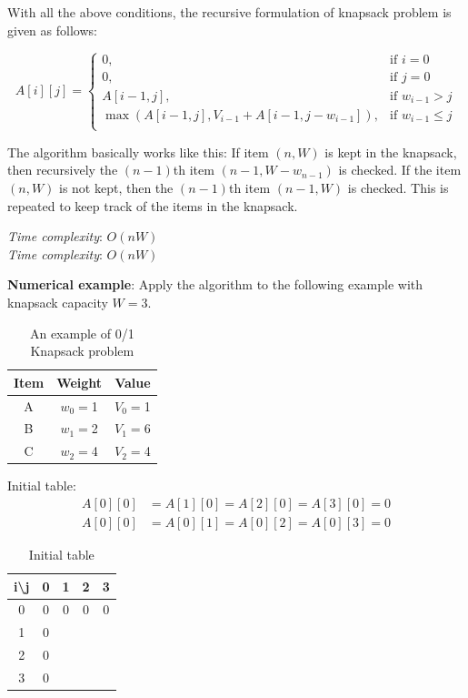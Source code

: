 \documentclass[a4paper,11pt]{book}
\begin{document}
\noindent With all the above conditions, the recursive formulation of knapsack problem is given as follows:

\[
    A[i][j]= 
\begin{cases}
    0, & \text{if } i=0\\
    0, & \text{if } j=0\\
    A[i-1,j], & \text{if } w_{i-1} > j\\
    \max(A[i-1,j], V_{i-1} + A[i-1,j-w_{i-1}]), & \text{if } w_{i-1} \leq j\\
\end{cases}
\]

\noindent The algorithm basically works like this: If item $(n,W)$ is kept in the knapsack, then recursively the $(n-1)$th item $(n-1, W-w_{n-1})$ is checked. If the item $(n,W)$ is not kept, then the $(n-1)$th item $(n-1, W)$ is checked. This is repeated to keep track of the items in the knapsack.

\vspace{5mm}

\noindent \textit{Time complexity}: $O(nW)$\\
\noindent \textit{Time complexity}: $O(nW)$

\vspace{3mm}

\noindent \textbf{Numerical example}: Apply the algorithm to the following example with knapsack capacity $W=3$.
\begin{table}[ht]
\centering
\begin{tabular}{|c|c|c|}
\hline
Item & Weight & Value \\ \hline
A    & $w_0=$1      & $V_0=$1     \\
B    & $w_1=$2      & $V_1=$6     \\
C    & $w_2=$4      & $V_2=$4 \\
\hline
\end{tabular}
\caption{An example of 0/1 Knapsack problem}
\end{table}

\noindent Initial table:
\begin{align*}
    A[0][0] &= A[1][0] = A[2][0] = A[3][0] = 0\\
    A[0][0] &= A[0][1] = A[0][2] = A[0][3] = 0
\end{align*}

\begin{table}[ht]
\centering
\begin{tabular}{|c|c|c|c|c|}
\hline
i\textbackslash{}j & 0 & 1 & 2 & 3 \\ \hline
0                  & 0 & 0 & 0 & 0 \\ \hline
1                  & 0 &   &   &   \\ \hline
2                  & 0 &   &   &   \\ \hline
3                  & 0 &   &   &   \\ \hline
\end{tabular}
\caption{Initial table}
\end{table}
\end{document}
